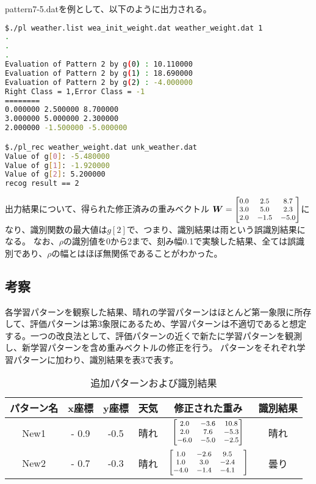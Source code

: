 \documentclass[ %
  uplatex,%
  papersize%
]{jsarticle}
\begin{document}
pattern7-5.datを例として、以下のように出力される。

\begin{lstlisting}[language=bash]
$./pl weather.list wea_init_weight.dat weather_weight.dat 1
.
.
.
Evaluation of Pattern 2 by g(0) : 10.110000
Evaluation of Pattern 2 by g(1) : 18.690000
Evaluation of Pattern 2 by g(2) : -4.000000
Right Class = 1,Error Class = -1
========
0.000000 2.500000 8.700000
3.000000 5.000000 2.300000
2.000000 -1.500000 -5.000000

$./pl_rec weather_weight.dat unk_weather.dat
Value of g[0]: -5.480000
Value of g[1]: -1.920000
Value of g[2]: 5.200000
recog result == 2

\end{lstlisting}

出力結果について、得られた修正済みの重みベクトル
$\footnotesize
\bm{W} = 
 \begin{bmatrix}
   0.0 & 2.5 & 8.7 \\
   3.0 & 5.0 & 2.3 \\
   2.0 & -1.5 & -5.0
  \end{bmatrix}
$になり、識別関数の最大値は$g[2]$で、つまり、識別結果は雨という誤識別結果になる。
なお、$\rho$の識別値を0から2まで、刻み幅0.1で実験した結果、全ては誤識別であり、$\rho$の幅とはほぼ無関係であることがわかった。

\subsection{考察}

各学習パターンを観察した結果、晴れの学習パターンはほとんど第一象限に所存して、評価パターンは第3象限にあるため、学習パターンは不適切であると想定する。一つの改良法として、評価パターンの近くで新たに学習パターンを観測し、新学習パターンを含め重みベクトルの修正を行う。
パターンをそれぞれ学習パターンに加わり、識別結果を表3で表す。
\begin{table}[h]\small
\caption{追加パターンおよび識別結果}
\label{}
\centering
\begin{tabular}{|c|ccc|c|c|}
\hline
パターン名& x座標 & y座標 & 天気& 修正された重み& 識別結果\\
\hline
New1& - 0.9 & -0.5 & 晴れ&
$\footnotesize
\begin{bmatrix}
2.0&-3.6&10.8\\
2.0& 7.6& -5.3\\
-6.0& -5.0& -2.5\\
\end{bmatrix}
$
&晴れ\\
\hline
New2& - 0.7 & -0.3 & 晴れ &
$\footnotesize
 \begin{bmatrix}
1.0&-2.6&9.5&\\
1.0&3.0&-2.4&\\
-4.0&-1.4&-4.1&\\
 \end{bmatrix}
$
&曇り\\
\hline                                               
\end{tabular} 
\end{table}
\end{document}
